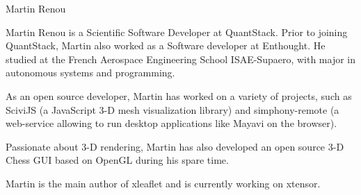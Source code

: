 \begin{participant}[type=R,PM=0,gender=male]{Martin Renou}

  \par Martin Renou is a Scientific Software Developer at QuantStack. Prior to joining QuantStack, Martin also worked as a Software developer at Enthought. He studied at the French Aerospace Engineering School ISAE-Supaero, with major in autonomous systems and programming.

  \par As an open source developer, Martin has worked on a variety of projects, such as SciviJS (a JavaScript 3-D mesh visualization library) and simphony-remote (a web-service allowing to run desktop applications like Mayavi on the browser).

  \par Passionate about 3-D rendering, Martin has also developed an open source 3-D Chess GUI based on OpenGL during his spare time.

  \par Martin is the main author of xleaflet and is currently working on xtensor.
\end{participant}

